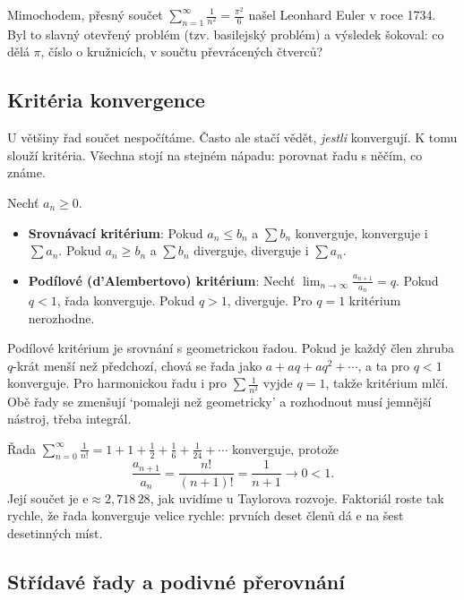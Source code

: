 Mimochodem, přesný součet $\sum_{n=1}^{\infty}\frac{1}{n^2} = \frac{\pi^2}{6}$ našel Leonhard Euler v roce 1734. Byl to slavný otevřený problém (tzv. basilejský problém) a výsledek šokoval: co dělá $\pi$, číslo o kružnicích, v součtu převrácených čtverců?

\subsection{Kritéria konvergence}

U většiny řad součet nespočítáme. Často ale stačí vědět, \textit{jestli} konvergují. K tomu slouží kritéria. Všechna stojí na stejném nápadu: porovnat řadu s něčím, co známe.

\begin{definitionbox}
  Nechť $a_n\geq 0$.
  \begin{itemize}
    \item \textbf{Srovnávací kritérium}: Pokud $a_n\leq b_n$ a $\sum b_n$ konverguje, konverguje i $\sum a_n$. Pokud $a_n\geq b_n$ a $\sum b_n$ diverguje, diverguje i $\sum a_n$.
    \item \textbf{Podílové (d'Alembertovo) kritérium}: Nechť $\lim_{n\to\infty}\frac{a_{n+1}}{a_n} = q$. Pokud $q < 1$, řada konverguje. Pokud $q > 1$, diverguje. Pro $q = 1$ kritérium nerozhodne.
  \end{itemize}
\end{definitionbox}

Podílové kritérium je srovnání s geometrickou řadou. Pokud je každý člen zhruba $q$-krát menší než předchozí, chová se řada jako $a + aq + aq^2 + \cdots$, a ta pro $q < 1$ konverguje. Pro harmonickou řadu i pro $\sum\frac{1}{n^2}$ vyjde $q = 1$, takže kritérium mlčí. Obě řady se zmenšují `pomaleji než geometricky' a rozhodnout musí jemnější nástroj, třeba integrál.

\begin{example}
  Řada $\sum_{n=0}^{\infty}\frac{1}{n!} = 1 + 1 + \frac{1}{2} + \frac{1}{6} + \frac{1}{24} + \cdots$ konverguje, protože
  \begin{equation*}
    \frac{a_{n+1}}{a_n} = \frac{n!}{(n + 1)!} = \frac{1}{n + 1}\to 0 < 1.
  \end{equation*}
  Její součet je $\mathrm{e}\approx 2{,}718\,28$, jak uvidíme u Taylorova rozvoje. Faktoriál roste tak rychle, že řada konverguje velice rychle: prvních deset členů dá $\mathrm{e}$ na šest desetinných míst.
\end{example}

\subsection{Střídavé řady a podivné přerovnání}

